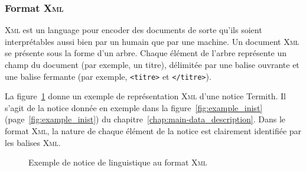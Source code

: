       \subsubsection{Format \textsc{Xml}}
      \label{subsubsec:main-automatic_evaluation_of_keyphrase_annotation-methodology-data_format-xml}
        \textsc{Xml} est un language pour encoder des documents de sorte qu'ils
        soient interprétables aussi bien par un humain que par une machine. Un
        document \textsc{Xml} se présente sous la forme d'un arbre. Chaque
        élément de l'arbre représente un champ du document (par exemple, un
        titre), délimitée par une balise ouvrante et une balise fermante (par
        exemple, \texttt{<titre>} et \texttt{</titre>}).

        La figure~\ref{fig:xml_example} donne un exemple de représentation
        \textsc{Xml} d'une notice Termith. Il s'agit de la notice donnée en
        exemple dans la figure~\ref{fig:example_inist}
        (page~\ref{fig:example_inist}) du
        chapitre~\ref{chap:main-data_description}. Dans le format \textsc{Xml},
        la nature de chaque élément de la notice est clairement identifiée par
        les balises \textsc{Xml}.
        \begin{figure}[h!]
          \lstset{language=XML}
          \lstset{frame=single}
          
          \caption{Exemple de notice de linguistique au format \textsc{Xml}
                   \label{fig:xml_example}}
        \end{figure}

